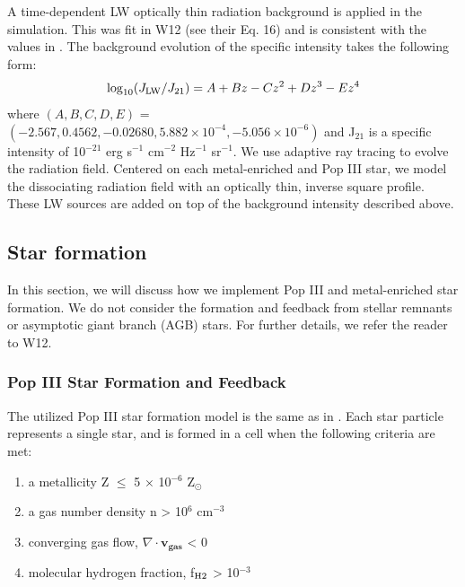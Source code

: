 \documentclass[a4paper,fleqn,usenatbib]{mnras}
\begin{document}
A time-dependent LW optically thin radiation background is applied in the simulation. This was fit in W12 (see their Eq. 16) and is consistent with the values in \citet{Trenti09_SFR}. The background evolution of the specific intensity takes the following form:
\begin{equation} \label{LWbg}
	\log_{10}(J_{\rm LW}/J_{21}) = A + Bz - Cz^{2} + Dz^{3} - Ez^{4}
\end{equation}
where $(A, B, C, D, E)$ = $(-2.567, 0.4562, - 0.02680, 5.882 \times 10^{-4}, - 5.056 \times 10^{-6})$ and J$_{21}$ is a specific intensity of 10$^{-21}$ erg s$^{-1}$ cm$^{-2}$ Hz$^{-1}$ sr$^{-1}$. We use adaptive ray tracing \citep{Abel02_RT, Wise11_Moray} to evolve the radiation field. Centered on each metal-enriched and Pop III star, we model the \hh{} dissociating radiation field with an optically thin, inverse square profile. These LW sources are added on top of the background intensity described above.
\subsection{Star formation}
In this section, we will discuss how we implement Pop III and metal-enriched star formation. We do not consider the formation and feedback from stellar remnants or asymptotic giant branch (AGB) stars. For further details, we refer the reader to W12. 

\subsubsection{Pop III Star Formation and Feedback }
The utilized Pop III star formation model is the same as in \citet{Wise08_Gal}. Each star particle represents a single star, and is formed in a cell when the following criteria are met: 
\begin{enumerate}
	\item a metallicity Z $\leq$ 5 $\times$ 10$^{-6}$ Z$_{\odot}$

	\item a gas number density n > 10$^{6}$ cm$^{-3}$

	\item converging gas flow, $\nabla \cdot \mathbf{v_{gas}}$ < 0 

	\item molecular hydrogen fraction, f$_{\rm H2}$ > 10$^{-3}$
\end{enumerate}
\end{document}
